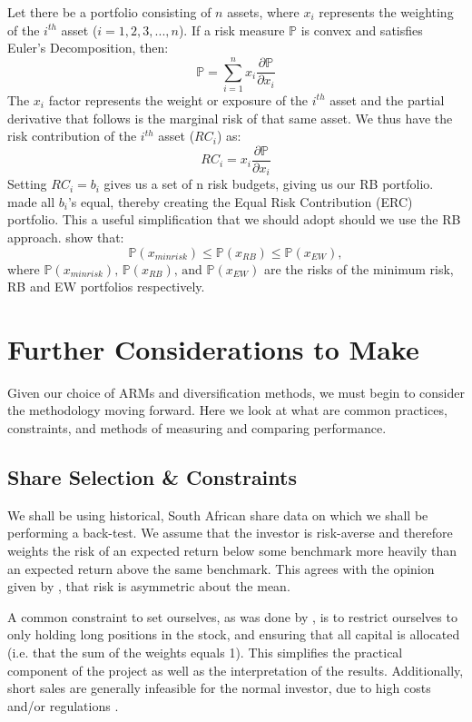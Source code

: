 \documentclass[12pt,a4paper]{article}
\begin{document}
Let there be a portfolio consisting of $n$ assets, where $x_i$ represents the weighting of the $i^{th}$ asset ($i=1,2,3,...,n$). If a risk measure $\mathbb{P}$ is convex and satisfies Euler's Decomposition, then:
$$
\mathbb{P}=\sum_{i=1}^{n}x_{i}\frac{\partial\mathbb{P}}{\partial{x_{i}}}
$$
The $x_i$ factor represents the weight or exposure of the $i^{th}$ asset and the partial derivative that follows is the marginal risk of that same asset. We thus have the risk contribution of the $i^{th}$ asset ($RC_i$) as:
$$
RC_i=x_{i}\frac{\partial\mathbb{P}}{\partial{x_{i}}}
$$
Setting $RC_i=b_i$ gives us a set of n risk budgets, giving us our RB portfolio. \cite{bruder2012managing} made all $b_i$'s equal, thereby creating the Equal Risk Contribution (ERC) portfolio. This a useful simplification that we should adopt should we use the RB approach. \cite{bruder2012managing} show that:
$$
\mathbb{P}(x_{min risk}) \leq \mathbb{P}(x_{RB}) \leq \mathbb{P}(x_{EW}),
$$
where
$\mathbb{P}(x_{min risk}) \text{, } \mathbb{P}(x_{RB}) \text{, and } \mathbb{P}(x_{EW})
$
are the risks of the minimum risk, RB and EW portfolios respectively. 

\section{Further Considerations to Make}
\label{sec:Further}

Given our choice of ARMs and diversification methods, we must begin to consider the methodology moving forward. Here we look at what are common practices, constraints, and methods of measuring and comparing performance. 

\subsection{Share Selection \& Constraints}
\label{subsec:Constraints}

We shall be using historical, South African share data on which we shall be performing a back-test. We assume that the investor is risk-averse and therefore weights the risk of an expected return below some benchmark more heavily than an expected return above the same benchmark. This agrees with the opinion given by \cite{CHEN20111777}, that risk is asymmetric about the mean. 

A common constraint to set ourselves, as was done by \cite{righi2017simulation}, is to restrict ourselves to only holding long positions in the stock, and ensuring that all capital is allocated (i.e. that the sum of the weights equals 1). This simplifies the practical component of the project as well as the interpretation of the results. Additionally, short sales are generally infeasible for the normal investor, due to high costs and/or regulations \citep{CHEN20111777}.
\end{document}
